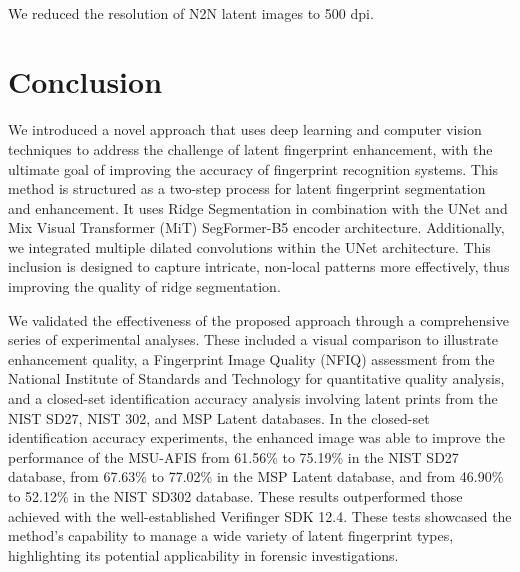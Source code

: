 \documentclass[twocolumn, switch]{article} %
\begin{document}
\begin{table}[H]
\centering

\\ \scriptsize * We reduced the resolution of N2N latent images to 500 dpi.
\caption{Rank-1 accuracies (\%) of different models against a background set of 100k rolled fingerprints, in addition to the true rolled mates of the latents prints of each database.}
\label{table_1_n}
\end{table}




\section{Conclusion}

We introduced a novel approach that uses deep learning and computer vision techniques to address the challenge of latent fingerprint enhancement, with the ultimate goal of improving the accuracy of fingerprint recognition systems. This method is structured as a two-step process for latent fingerprint segmentation and enhancement. It uses Ridge Segmentation in combination with the UNet and Mix Visual Transformer (MiT) SegFormer-B5 encoder architecture. Additionally, we integrated multiple dilated convolutions within the UNet architecture. This inclusion is designed to capture intricate, non-local patterns more effectively, thus improving the quality of ridge segmentation.

We validated the effectiveness of the proposed approach through a comprehensive series of experimental analyses. These included a visual comparison to illustrate enhancement quality, a Fingerprint Image Quality (NFIQ) assessment from the National Institute of Standards and Technology for quantitative quality analysis, and a closed-set identification accuracy analysis involving latent prints from the NIST SD27, NIST 302, and MSP Latent databases. In the closed-set identification accuracy experiments, the enhanced image was able to improve the performance of the MSU-AFIS from 61.56\% to 75.19\% in the NIST SD27 database, from 67.63\% to 77.02\% in the MSP Latent database, and from 46.90\% to 52.12\% in the NIST SD302 database. These results outperformed those achieved with the well-established Verifinger SDK 12.4. These tests showcased the method's capability to manage a wide variety of latent fingerprint types, highlighting its potential applicability in forensic investigations.
\end{document}
